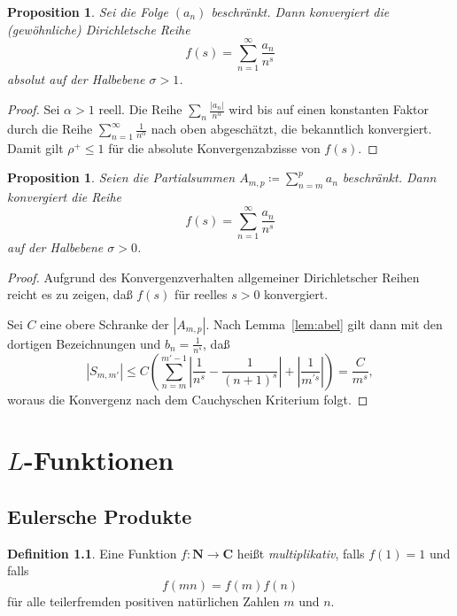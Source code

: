 \documentclass[a4paper,twoside,openright]{report}
\newtheorem{prop}[thm]{Proposition}
\theoremstyle{definition}
\newtheorem{dfn}[thm]{Definition}
\theoremstyle{remark}
\begin{document}
\begin{prop}
  \label{prop:dirichlet1}
  Sei die Folge $(a_n)$ beschränkt. Dann konvergiert die (gewöhnliche) Dirichletsche
  Reihe
  \[
    f(s) = \sum_{n = 1}^\infty \frac{a_n}{n^s}
  \]
  absolut auf der Halbebene $\sigma > 1$.
\end{prop}

\begin{proof}
  Sei $\alpha > 1$ reell. Die Reihe $\sum_n \frac{|a_n|}{n^\alpha}$ wird bis auf einen konstanten Faktor
  durch die Reihe $\sum_{n = 1}^\infty \frac 1 {n^\alpha}$ nach oben abgeschätzt, 
  die bekanntlich konvergiert. Damit gilt $\rho^+ \leq 1$ für die absolute Konvergenzabzisse
  von $f(s)$.
\end{proof}

\begin{prop}
  \label{prop:convergence_zero}
  Seien die Partialsummen $A_{m, p} \coloneqq \sum_{n = m}^p a_n$ beschränkt. Dann konvergiert
  die Reihe
  \[
    f(s) = \sum_{n = 1}^\infty \frac{a_n}{n^s}
  \]
  auf der Halbebene $\sigma > 0$.
\end{prop}

\begin{proof}
  Aufgrund des Konvergenzverhalten allgemeiner Dirichletscher Reihen reicht
  es zu zeigen, daß $f(s)$ für reelles $s > 0$ konvergiert.
    
  Sei $C$ eine obere Schranke der $|A_{m, p}|$. Nach Lemma~\ref{lem:abel}
  gilt dann mit den dortigen Bezeichnungen und $b_n = \frac 1 {n^s}$, daß
  \[
    |S_{m, m'}| \leq C \left(
      \sum_{n = m}^{m' - 1} \left|\frac 1{n^s} - \frac 1 {(n + 1)^s}\right| + \left|\frac 1 {m^{\prime s}}\right|
    \right) = \frac C{m^s},
  \]
  woraus die Konvergenz nach dem Cauchyschen Kriterium folgt.
\end{proof}

\chapter{$L$-Funktionen}

\section{Eulersche Produkte}

\begin{dfn}
  Eine Funktion $f\colon \mathbf N \to \mathbf C$ heißt \emph{multiplikativ},
  falls $f(1) = 1$ und falls
  \[
    f(mn) = f(m) f(n)
  \]
  für alle teilerfremden positiven natürlichen Zahlen $m$ und $n$.
\end{dfn}
\end{document}
